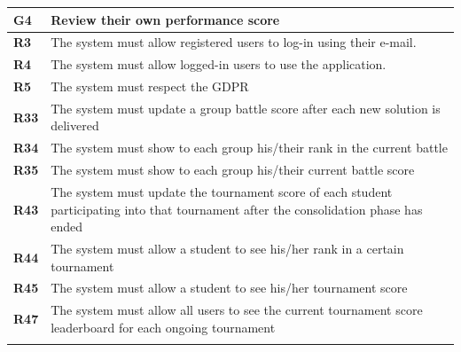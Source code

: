 \documentclass[../RASD.tex]{subfiles}
\begin{document}
        \begin{table}[ht]
            \begin{center}
                \begin{tabular}{|m{2em}|m{30em}|}
                \hline
                \rowcolor{ReqMappingRow1}
                \textbf{G4} & \textbf{Review their own performance score}\\
                \hline
                \cellcolor{ReqMappingCell2}
                \textbf{R3} & The system must allow registered users to log-in using their e-mail.\\
                \hline
                \cellcolor{ReqMappingCell2}
                \textbf{R4} & The system must allow logged-in users to use the application.\\
                \hline
                \cellcolor{ReqMappingCell2}
                \textbf{R5} & The system must respect the GDPR\\
                \hline
                \cellcolor{ReqMappingCell2}
                \textbf{R33} & The system must update a group battle score after each new solution is delivered\\
                \hline
                \cellcolor{ReqMappingCell2}
                \textbf{R34} & The system must show to each group his/their rank in the current battle\\
                \hline
                \cellcolor{ReqMappingCell2}
                \textbf{R35} & The system must show to each group his/their current battle score\\
                \hline
                \cellcolor{ReqMappingCell2}
                \textbf{R43} & The system must update the tournament score of each student participating into that tournament after the consolidation phase has ended\\
                \hline
                \cellcolor{ReqMappingCell2}
                \textbf{R44} & The system must allow a student to see his/her rank in a certain tournament\\
                \hline
                \cellcolor{ReqMappingCell2}
                \textbf{R45} & The system must allow a student to see his/her tournament score\\
                \hline
                \cellcolor{ReqMappingCell2}
                \textbf{R47} & The system must allow all users to see the current tournament score leaderboard for each ongoing tournament\\
                \hline
                \cellcolor{ReqMappingCell3}

\end{tabular}
\end{center}
\end{table}
\end{document}
